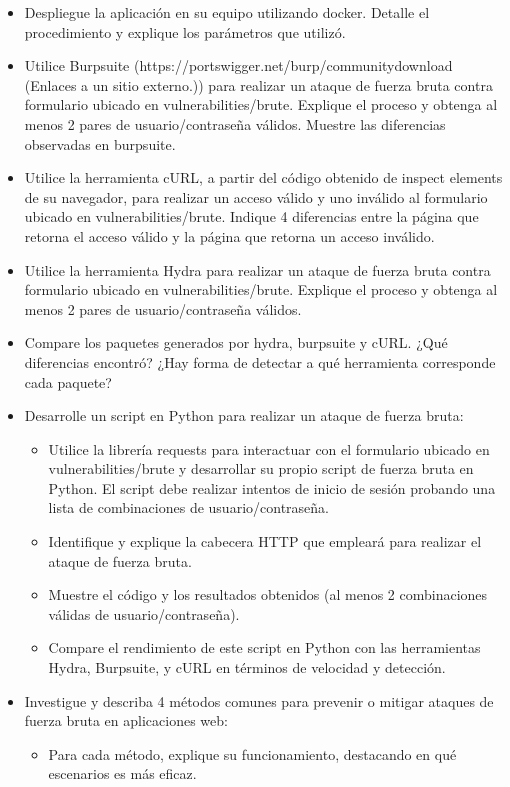 \documentclass[letterpaper,12pt]{article}
\begin{document}
\begin{itemize}
    \item Despliegue la aplicación en su equipo utilizando docker. Detalle el procedimiento y explique los parámetros que utilizó.
    \item Utilice Burpsuite (https://portswigger.net/burp/communitydownload (Enlaces a un sitio externo.)) para realizar un ataque de fuerza bruta contra formulario ubicado en vulnerabilities/brute. Explique el proceso y obtenga al menos 2 pares de usuario/contraseña válidos. Muestre las diferencias observadas en burpsuite.
    \item Utilice la herramienta cURL, a partir del código obtenido de inspect elements de su navegador, para realizar un acceso válido y uno inválido al formulario ubicado en vulnerabilities/brute. Indique 4 diferencias entre la página que retorna el acceso válido y la página que retorna un acceso inválido.
    \item Utilice la herramienta Hydra para realizar un ataque de fuerza bruta contra formulario ubicado en vulnerabilities/brute. Explique el proceso y obtenga al menos 2 pares de usuario/contraseña válidos.
    \item Compare los paquetes generados por hydra, burpsuite y cURL. ¿Qué diferencias encontró? ¿Hay forma de detectar a qué herramienta corresponde cada paquete?

    \item Desarrolle un script en Python para realizar un ataque de fuerza bruta:

    \begin{itemize}
        \item Utilice la librería requests para interactuar con el formulario ubicado en vulnerabilities/brute y desarrollar su propio script de fuerza bruta en Python.
        El script debe realizar intentos de inicio de sesión probando una lista de combinaciones de usuario/contraseña.

        \item  Identifique y explique la cabecera HTTP que empleará para realizar el ataque de fuerza bruta.

        \item  Muestre el código y los resultados obtenidos (al menos 2 combinaciones válidas de usuario/contraseña).

        \item Compare el rendimiento de este script en Python con las herramientas Hydra, Burpsuite, y cURL en términos de velocidad y detección.
    \end{itemize}

    \item  Investigue y describa 4 métodos comunes para prevenir o mitigar ataques de fuerza bruta en aplicaciones web:

    \begin{itemize}
        \item Para cada método, explique su funcionamiento, destacando en qué escenarios es más eficaz.

    \end{itemize}


    
\end{itemize}
\end{document}
